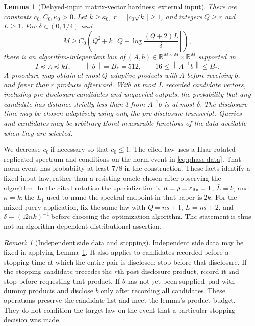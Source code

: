 \documentclass[11pt]{article}
\newtheorem{lemma}[theorem]{Lemma}
\theoremstyle{definition}
\theoremstyle{remark}
\newtheorem{remark}[theorem]{Remark}
\newcommand{\R}{\mathbb R}
\newcommand{\norm}[1]{\left\|#1\right\|}
\begin{document}
\begin{samepage}
\begin{lemma}[Delayed-input matrix-vector hardness; external input]\label{lem:external}
There are constants $c_0,C_0,\kappa_0>0$. Let $k\ge\kappa_0$, $r=\lfloor c_0\sqrt{k}\rfloor\ge1$, and integers $Q\ge r$ and $L\ge1$. For $\delta\in(0,1/4)$ and
\begin{equation}\label{eq:M}
 M\ge C_0\left(Q^2+k\left[Q+\log\frac{(Q+2)L}{\delta}\right]\right),
\end{equation}
there is an algorithm-independent law of $(A,b)\in\R^{M\times M}\times\R^M$ supported on
\begin{equation}\label{eq:phase-data}
 I\preceq A\preceq kI,\qquad \norm b=B_*=512,\qquad
 16\le\norm{A^{-1}b}\le B_*.
\end{equation}
A procedure may obtain at most $Q$ adaptive products with $A$ before receiving $b$, and fewer than $r$ products afterward. With at most $L$ recorded candidate vectors, including pre-disclosure candidates and unqueried outputs, the probability that any candidate has distance strictly less than $3$ from $A^{-1}b$ is at most $\delta$. The disclosure time may be chosen adaptively using only the pre-disclosure transcript. Queries and candidates may be arbitrary Borel-measurable functions of the data available when they are selected.
\end{lemma}
\end{samepage}
We decrease $c_0$ if necessary so that $c_0\le1$. The cited law uses a Haar-rotated replicated spectrum and conditions on the norm event in \eqref{eq:phase-data}. That norm event has probability at least $7/8$ in the construction. These facts identify a fixed input law, rather than a resisting oracle chosen after observing the algorithm. In the cited notation the specialization is $\mu=\rho=\varepsilon_{\rm lin}=1$, $\bar L=k$, and $\kappa=k$; the $L_1$ used to name the spectral endpoint in that paper is $2k$. For the mixed-query application, fix the same law with $Q=ns+1$, $L=ns+2$, and $\delta=(12nk)^{-1}$ before choosing the optimization algorithm. The statement is thus not an algorithm-dependent distributional assertion.

\begin{remark}[Independent side data and stopping]\label{rem:stopping}
Independent side data may be fixed in applying Lemma~\ref{lem:external}. It also applies to candidates recorded before a stopping time at which the entire pair is disclosed: stop before that disclosure. If the stopping candidate precedes the $r$th post-disclosure product, record it and stop before requesting that product. If $b$ has not yet been supplied, pad with dummy products and disclose $b$ only after recording all candidates. These operations preserve the candidate list and meet the lemma's product budget. They do not condition the target law on the event that a particular stopping decision was made.
\end{remark}
\end{document}
